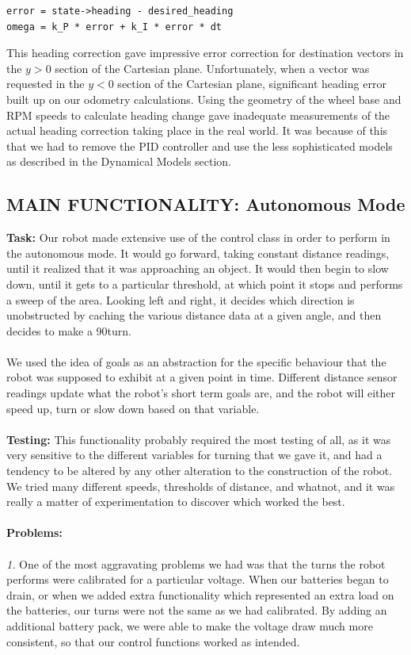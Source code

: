 \documentclass[paper=a4, fontsize=11pt]{scrartcl}
\numberwithin{equation}{section}		%
\numberwithin{figure}{section}			%
\numberwithin{table}{section}				%
\begin{document}
{\begin{verbatim}
error = state->heading - desired_heading
omega = k_P * error + k_I * error * dt
\end{verbatim}
This heading correction gave impressive error correction for destination vectors in the $y>0$ section of the Cartesian plane. Unfortunately, when a vector was requested in the $y<0$ section of the Cartesian plane, significant heading error built up on our odometry calculations. Using the geometry of the wheel base and RPM speeds to calculate heading change gave inadequate measurements of the actual heading correction taking place in the real world. It was because of this that we had to remove the PID controller and use the less sophisticated models as described in the Dynamical Models section.

\subsection{MAIN FUNCTIONALITY: Autonomous Mode}
\textbf{Task: }Our robot made extensive use of the control class in order to perform in the autonomous mode. It would go forward, taking constant distance readings, until it realized that it was approaching an object. It would then begin to slow down, until it gets to a particular threshold, at which point it stops and performs a sweep of the area. Looking left and right, it decides which direction is unobstructed by caching the various distance data at a given angle, and then decides to make a 90\degree turn.
\\\\
We used the idea of goals as an abstraction for the specific behaviour that the robot was supposed to exhibit at a given point in time. Different distance sensor readings update what the robot's short term goals are, and the robot will either speed up, turn or slow down based on that variable.
\\\\
\textbf{Testing: } This functionality probably required the most testing of all, as it was very sensitive to the different variables for turning that we gave it, and had a tendency to be altered by any other alteration to the construction of the robot. We tried many different speeds, thresholds of distance, and whatnot, and it was really a matter of experimentation to discover which worked the best.
\\\\
\textbf{Problems: }\\\\
\textit{1. }One of the most aggravating problems we had was that the turns the robot performs were calibrated for a particular voltage. When our batteries began to drain, or when we added extra functionality which represented an extra load on the batteries, our turns were not the same as we had calibrated. By adding an additional battery pack, we were able to make the voltage draw much more consistent, so that our control functions worked as intended.
}
\end{document}
